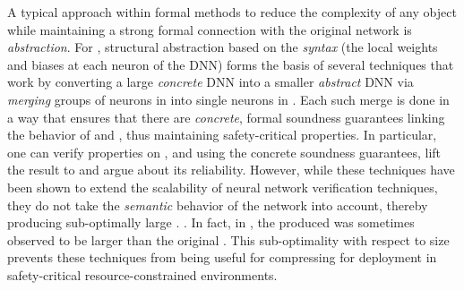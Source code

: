
A typical approach within formal methods to reduce the complexity of any object
while maintaining a strong formal connection with the original network is
\emph{abstraction}.
For \dnn, structural abstraction based on the \emph{syntax} (the local weights
and biases at each neuron of the DNN) forms the basis of several techniques
\cite{cegar-nn,cegarette,cleverest-nn,conv-abs-gk} 
that work by converting a large \emph{concrete}
DNN \cnc into a smaller \emph{abstract} DNN \abs via \emph{merging} groups
of neurons in \cnc into single neurons in \abs. 
Each such merge is done in a
way that ensures that there are \textit{concrete}, formal soundness guarantees
linking the behavior of \cnc and \abs, thus maintaining safety-critical
properties. 
In particular, one can verify properties on \abs, and
using the concrete soundness guarantees, lift the result to \cnc and argue
about its reliability. 
However, while these techniques have been shown to extend the scalability of
neural network verification techniques, they do not take the \emph{semantic}
behavior of the network into account, thereby producing sub-optimally large
\abs. \cite{cegar-nn}. 
In fact, in \cite{cegar-nn}, the \abs produced was sometimes observed to be
larger than the original \cnc.
This sub-optimality with respect to size prevents these techniques from being
useful for compressing \dnn for deployment in safety-critical
resource-constrained environments.

